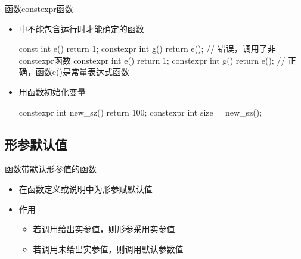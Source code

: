\begin{frame}[fragile]{函数}{constexpr函数}
  \stretchon
  \begin{itemize}
  \item {}中不能包含运行时才能确定的函数\\[-1.5ex]
    \begin{cppcode}
const int e() 
{        
  return 1;
}
constexpr int g()
{
  return e();     // 错误，调用了非constexpr函数
}
constexpr int e() 
{        
  return 1;
}
constexpr int g() 
{
  return e();     // 正确，函数e()是常量表达式函数
}
    \end{cppcode}
  \item 用函数初始化变量\\[-1.5ex]
    \begin{cppcode}
constexpr int new_sz()
{
  return 100;
}
constexpr int size = new_sz();
    \end{cppcode}
  \end{itemize}
  \stretchoff
\end{frame}
\subsection[形参默认值]{形参默认值}
\begin{frame}[fragile]{函数}{带默认形参值的函数}
  \begin{spacing}{1.8}
    \begin{itemize}
    \item 在函数定义或说明中\alert{为形参赋默认值}
    \item 作用
      \begin{itemize}
      \item 若调用给出实参值，则形参采用实参值
      \item 若调用未给出实参值，则调用默认参数值
      \end{itemize}
    \end{itemize}
  \end{spacing}
  \vspace{-2ex}
  \begin{center}
    \begin{minipage}{0.9\linewidth}
    \end{minipage}
  \end{center}
\end{frame}

